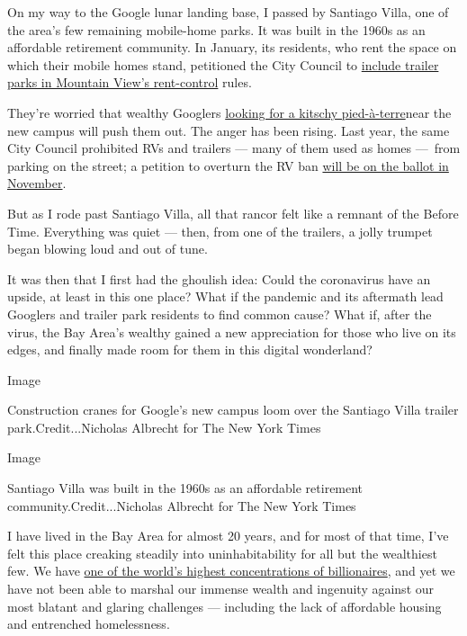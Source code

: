 On my way to the Google lunar landing base, I passed by Santiago Villa,
one of the area's few remaining mobile-home parks. It was built in the
1960s as an affordable retirement community. In January, its residents,
who rent the space on which their mobile homes stand, petitioned the
City Council to
\href{https://mv-voice.com/news/2020/01/30/city-council-agrees-in-theory-to-extend-rent-control-to-mountain-view-mobile-home-parks}{include
trailer parks in Mountain View's rent-control} rules.

They're worried that wealthy Googlers
\href{https://www.theringer.com/2016/8/18/16039104/google-santiago-villa-housing-4ac4b1ca49fe}{looking
for a kitschy pied-à-terre}near the new campus will push them out. The
anger has been rising. Last year, the same City Council prohibited RVs
and trailers --- many of them used as homes ---~from parking on the
street; a petition to overturn the RV ban
\href{https://www.mv-voice.com/news/2020/01/15/mountain-view-voters-to-decide-on-rv-parking-ban}{will
be on the ballot in November}.

But as I rode past Santiago Villa, all that rancor felt like a remnant
of the Before Time. Everything was quiet --- then, from one of the
trailers, a jolly trumpet began blowing loud and out of tune.

It was then that I first had the ghoulish idea: Could the coronavirus
have an upside, at least in this one place? What if the pandemic and its
aftermath lead Googlers and trailer park residents to find common cause?
What if, after the virus, the Bay Area's wealthy gained a new
appreciation for those who live on its edges, and finally made room for
them in this digital wonderland?

Image

Construction cranes for Google's new campus loom over the Santiago Villa
trailer park.Credit...Nicholas Albrecht for The New York Times

Image

Santiago Villa was built in the 1960s as an affordable retirement
community.Credit...Nicholas Albrecht for The New York Times

I have lived in the Bay Area for almost 20 years, and for most of that
time, I've felt this place creaking steadily into uninhabitability for
all but the wealthiest few. We have
\href{https://www.sfchronicle.com/bayarea/article/billionaires-San-Francisco-world-report-wealth-x-13832316.php}{one
of the world's highest concentrations of billionaires}, and yet we have
not been able to marshal our immense wealth and ingenuity against our
most blatant and glaring challenges --- including the lack of affordable
housing and entrenched homelessness.

